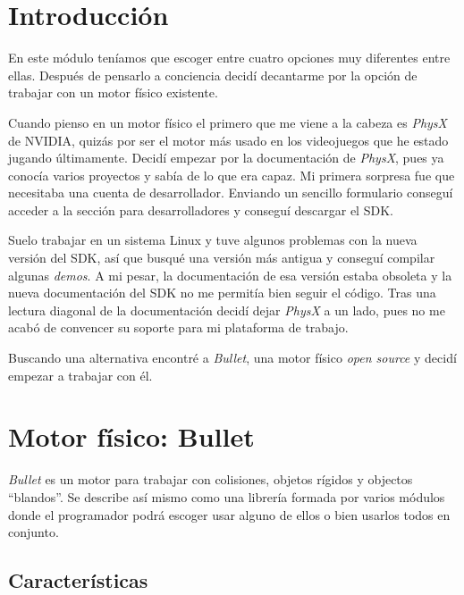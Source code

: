 \documentclass[12pt]{article}
\begin{document}
\maketitle

\tableofcontents

\section{Introducción}

En este módulo teníamos que escoger entre cuatro opciones muy diferentes entre ellas. Después de pensarlo a conciencia decidí decantarme por la opción de trabajar con un motor físico existente.

Cuando pienso en un motor físico el primero que me viene a la cabeza es \textit{PhysX} de NVIDIA, quizás por ser el motor más usado en los videojuegos que he estado jugando últimamente. Decidí empezar por la documentación de \textit{PhysX}, pues ya conocía varios proyectos y sabía de lo que era capaz. Mi primera sorpresa fue que necesitaba una cuenta de desarrollador. Enviando un sencillo formulario conseguí acceder a la sección para desarrolladores y conseguí descargar el SDK.

Suelo trabajar en un sistema Linux y tuve algunos problemas con la nueva versión del SDK, así que busqué una versión más antigua y conseguí compilar algunas \textit{demos}. A mi pesar, la documentación de esa versión estaba obsoleta y la nueva documentación del SDK no me permitía bien seguir el código. Tras una lectura diagonal de la documentación decidí dejar \textit{PhysX} a un lado, pues no me acabó de convencer su soporte para mi plataforma de trabajo.

Buscando una alternativa encontré a \textit{Bullet}, una motor físico \textit{open source} y decidí empezar a trabajar con él.

\section{Motor físico: Bullet}

\textit{Bullet} es un motor para trabajar con colisiones, objetos rígidos y objectos ``blandos''. Se describe así mismo como una librería formada por varios módulos donde el programador podrá escoger usar alguno de ellos o bien usarlos todos en conjunto.

\subsection{Características}
\end{document}

